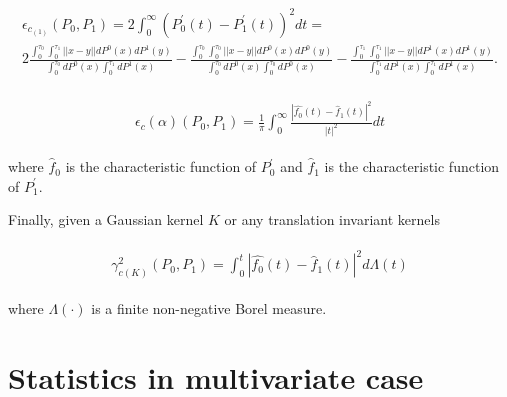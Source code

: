 \documentclass[11pt]{article}
\begin{document}
\begin{appendices}
\begin{gather}
\begin{align*}
\epsilon_{c_{(1)}}(P_0,P_1)=  2\int_{0}^{\infty} (P^{\prime}_0(t)-P^{\prime}_1(t))^{2} dt= \\
	2\frac{\int_{0}^{\tau_0} \int_{0}^{\tau_1} ||x-y|| dP^{0}(x) dP^{1}(y)}{\int_{0}^{\tau_0}dP^{0}(x)\int_{0}^{\tau_1}dP^{1}(x)}-\frac{\int_{0}^{\tau_0} \int_{0}^{\tau_0} ||x-y|| dP^{0}(x) dP^{0}(y)}{\int_{0}^{\tau_0}dP^{0}(x)\int_{0}^{\tau_0}dP^{0}(x)}-\frac{\int_{0}^{\tau_1} \int_{0}^{\tau_1} ||x-y|| dP^{1}(x) dP^{1}(y)}{\int_{0}^{\tau_1}dP^{1}(x)\int_{0}^{\tau_1}dP^{1}(x)}.
\end{align*}
\end{gather}


\begin{gather}
\begin{align*}
\epsilon_c(\alpha)(P_0,P_1)=  \frac{1}{\pi}\int_{0}^{\infty} \frac{|\hat{f_0}(t)-\hat{f}_1(t)|^2}{|t|^{2}} dt
\end{align*}
\end{gather}

where $\hat{f}_0$ is the characteristic function of $P_0^{\prime}$ and 
$\hat{f}_1$ is the characteristic function of $P_1^{\prime}$.


Finally, given a Gaussian kernel $K$ or any translation invariant kernels

\begin{gather}
\begin{align*}
\gamma_{c(K)}^{2}(P_0,P_1) = \int_{0}^{t} |\hat{f_0}(t)-\hat{f}_1(t)|^2 d\Lambda(t)
\end{align*}  
\end{gather}

where $\Lambda(\cdot)$ is a finite non-negative Borel measure. 





\section{Statistics in multivariate case}




\label{appendix:D}



\end{appendices}
\end{document}
